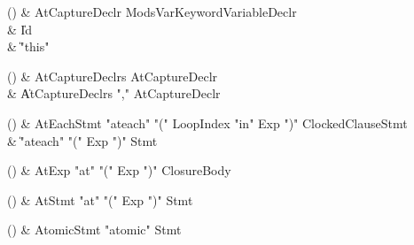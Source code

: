 \begin{bbgrammarappendix}

() & AtCaptureDeclr \label{prod:AtCaptureDeclr}  \: Mods\opt VarKeyword\opt VariableDeclr  \\

 &    \| Id \\
 &    \| \xcd"this" \\

\end{bbgrammarappendix}

\begin{bbgrammarappendix}

() & AtCaptureDeclrs \label{prod:AtCaptureDeclrs}  \: AtCaptureDeclr  \\

 &    \| AtCaptureDeclrs \xcd"," AtCaptureDeclr \\

\end{bbgrammarappendix}

\begin{bbgrammarappendix}

() & AtEachStmt \label{prod:AtEachStmt}  \: \xcd"ateach" \xcd"(" LoopIndex \xcd"in" Exp \xcd")" ClockedClause\opt Stmt  \\

 &    \| \xcd"ateach" \xcd"(" Exp \xcd")" Stmt \\

\end{bbgrammarappendix}

\begin{bbgrammarappendix}

() & AtExp \label{prod:AtExp}  \: \xcd"at" \xcd"(" Exp \xcd")" ClosureBody  \\


\end{bbgrammarappendix}

\begin{bbgrammarappendix}

() & AtStmt \label{prod:AtStmt}  \: \xcd"at" \xcd"(" Exp \xcd")" Stmt  \\


\end{bbgrammarappendix}

\begin{bbgrammarappendix}

() & AtomicStmt \label{prod:AtomicStmt}  \: \xcd"atomic" Stmt  \\


\end{bbgrammarappendix}


